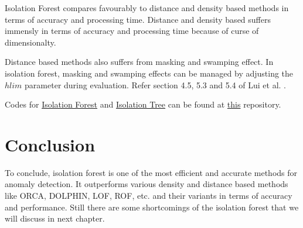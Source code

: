 Isolation Forest compares favourably to distance and density  based methods in terms of accuracy and processing time. 
Distance and density based suffers immensly in terms of accuracy and processing time because of curse of dimensionalty.


Distance based methods also suffers from masking and swamping effect. 
In isolation forest, masking and swamping effects can be managed by adjusting the $hlim$ parameter during evaluation. Refer section 4.5, 5.3 and 5.4 of Lui et al. \cite{10.1145/2133360.2133363}.


Codes for \href{https://github.com/KishoreKaushal/AnomalyDetection/blob/master/isolationforest/IsolationForest.py}{Isolation Forest} and \href{https://github.com/KishoreKaushal/AnomalyDetection/blob/master/isolationforest/IsolationTree.py}{Isolation Tree} can be found at \href{https://github.com/KishoreKaushal/AnomalyDetection}{this} repository.


\section{Conclusion}
\label{sec:iforest-conclusion}

To conclude, isolation forest is one of the most efficient and accurate methods for anomaly detection. It outperforms various density and distance based methods like ORCA, DOLPHIN, LOF, ROF, etc. and their variants in terms of accuracy and performance. Still there are some shortcomings of the isolation forest that we will discuss in next chapter.

